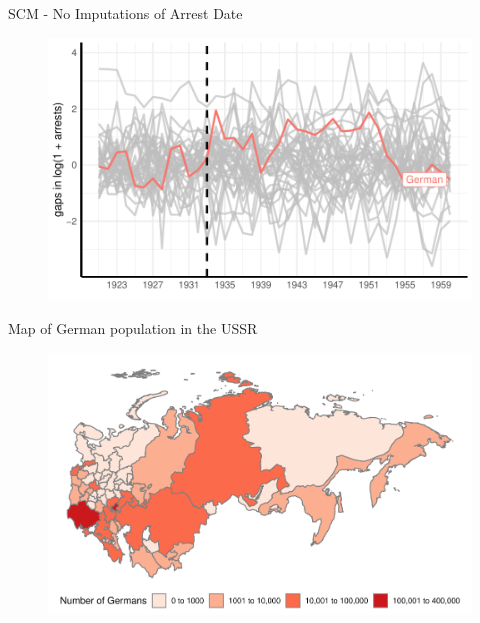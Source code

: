 \documentclass[11pt]{beamer}
\begin{document}
\begin{frame}[label=sc_no_date_imputation]{SCM - No Imputations of Arrest Date}
 \begin{figure}[h]
\centering
\includegraphics[width=1\textwidth]{placebo_highlight_all_no_date_imputation.pdf}
\end{figure}
\hyperlink{add_content}{}
\end{frame}


\begin{frame}[label=map_counts]{Map of German population in the USSR}
 \begin{figure}[h]
\centering
\includegraphics[width=1\textwidth]{map_number_of_germans_discrete.pdf}
\end{figure}
\hyperlink{add_content}{}
\end{frame}
\end{document}

